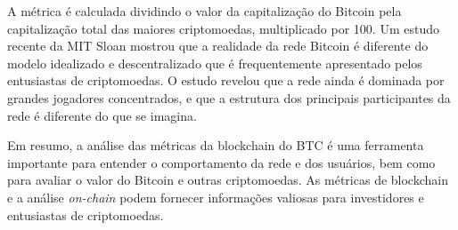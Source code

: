 \documentclass[a4paper,12pt]{article}
\begin{document}
A métrica é calculada dividindo o valor da capitalização do Bitcoin pela 
capitalização total das maiores criptomoedas, multiplicado por 100.
Um estudo recente da MIT Sloan mostrou que a realidade da rede Bitcoin 
é diferente do modelo idealizado e descentralizado que é frequentemente 
apresentado pelos entusiastas de criptomoedas. O estudo revelou que a 
rede ainda é dominada por grandes jogadores concentrados, e que a estrutura 
dos principais participantes da rede é diferente do que se imagina.

Em resumo, a análise das métricas da blockchain do BTC é uma ferramenta 
importante para entender o comportamento da rede e dos usuários, bem como 
para avaliar o valor do Bitcoin e outras criptomoedas. As métricas de blockchain 
e a análise \textit{on-chain} podem fornecer informações valiosas para investidores e 
entusiastas de criptomoedas.
\end{document}
